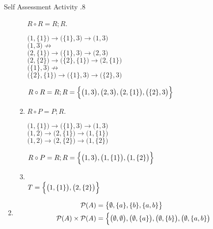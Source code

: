 \documentclass[../notes.tex]{subfiles}
\begin{document}
\begin{exercise}{Self Assessment Activity \thechapter.8}
\begin{enumerate}
\begin{enumerate}[label=(\alph*)]
									$R \circ R = R; R$.
									\begin{indentparagraph}
										$\bigl(1, \{1\}\bigr) \rightarrow \bigl(\{1\}, 3\bigr) \rightarrow \bigl(1, 3\bigr)$\\
										$\bigl(1, 3\bigr) \not \rightarrow$\\
										$\bigl(2, \{1\}\bigr) \rightarrow \bigl(\{1\}, 3\bigr) \rightarrow \bigl(2, 3\bigr)$\\
										$\bigl(2, \{2\}\bigr) \rightarrow \bigl(\{2\}, \{1\}\bigr) \rightarrow \bigl(2, \{1\}\bigr)$\\
										$\bigl(\{1\}, 3\bigr) \not \rightarrow$\\
										$\bigl(\{2\}, \{1\}\bigr) \rightarrow \bigl(\{1\}, 3\bigr) \rightarrow \bigl(\{2\}, 3\bigr)$
									\end{indentparagraph}
									$R \circ R = R; R = \Bigl\{\bigl(1, 3\bigr), \bigl(2, 3\bigr), \bigl(2, \{1\}\bigr), \bigl(\{2\}, 3\bigr)\Bigr\}$
								\item {}
									$R \circ P = P;R$.
									\begin{indentparagraph}
										$\bigl(1, \{1\}\bigr) \rightarrow \bigl(\{1\}, 3\bigr) \rightarrow \bigl(1, 3\bigr)$\\
										$\bigl(1, 2\bigr) \rightarrow \bigl(2, \{1\}\bigr) \rightarrow \bigl(1, \{1\}\bigr)$\\
										$\bigl(1, 2\bigr) \rightarrow \bigl(2, \{2\}\bigr) \rightarrow \bigl(1, \{2\}\bigr)$
									\end{indentparagraph}
									$R \circ P = R;R = \Bigl\{\bigl(1, 3\bigr), \bigl(1, \{1\}\bigr), \bigl(1, \{2\}\bigr)\Bigr\}$
								\item {}\\
									$T = \Bigl\{\bigl(1, \{1\}\bigr), \bigl(2, \{2\}\bigr)\Bigr\}$
							\end{enumerate}
						\item {}
							\begin{align*}
								\mathcal{P}(A) &= \bigl\{\emptyset, \{a\}, \{b\}, \{a, b\}\bigr\}\\
								\mathcal{P}(A) \times \mathcal{P}(A) &= \Bigl\{
									\bigl(\emptyset, \emptyset\bigr), \bigl(\emptyset, \{a\}\bigr), \bigl(\emptyset, \{b\}\bigr), \bigl(\emptyset, \{a, b\}\bigr)\\

\end{align*}
\end{enumerate}
\end{exercise}
\end{document}
